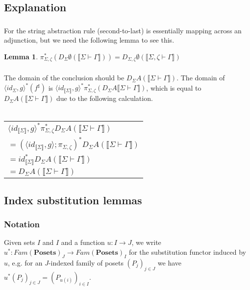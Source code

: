 \documentclass{article}
\newtheorem{lemma}{Lemma}
\newcommand{\mbf}{\mathbf}
\newcommand{\sem}[1]{\llbracket #1 \rrbracket}
\newcommand{\sdisp}[1]{
\left( #1 \right)
}
\begin{document}
\subsection*{Explanation}

\subsubsection*{}
For the string abstraction rule (second-to-last) is essentially mapping across an adjunction, but we need the following lemma to see this.
\begin{lemma}
$\pi^*_{\Sigma,\zeta}(D_{\Sigma} \emptyset(\sem{\Sigma \vdash \Gamma})) = D_{\Sigma,\zeta} \emptyset(\sem{\Sigma,\zeta \vdash \Gamma})$
\end{lemma}

\subsubsection*{}

The domain of the conclusion should be $D_{\Sigma}A(\sem{\Sigma \vdash \Gamma})$. The domain of $\langle \mathit{id}_{\Sigma}, g \rangle^*(f^\sharp)$ is $\langle \mathit{id}_{\sem{\Sigma}}, g \rangle^* \pi_{\Sigma,\zeta}^*(D_{\Sigma} A \sem{\Sigma \vdash \Gamma})$, which is equal to $D_{\Sigma}A(\sem{\Sigma \vdash \Gamma})$ due to the following calculation.\\~\\
\begin{tabu}{l}
$\langle \mathit{id}_{\sem{\Sigma}}, g \rangle^* \pi_{\Sigma,\zeta}^* D_{\Sigma} A (\sem{\Sigma \vdash \Gamma})$ \\
$= (\langle \mathit{id}_{\sem{\Sigma}}, g \rangle; \pi_{\Sigma,\zeta})^* D_{\Sigma} A (\sem{\Sigma \vdash \Gamma})$ \\
$= id_{\sem{\Sigma}}^* D_{\Sigma} A (\sem{\Sigma \vdash \Gamma})$ \\
$= D_{\Sigma} A (\sem{\Sigma \vdash \Gamma})$
\end{tabu}

\subsection*{Index substitution lemmas}

\subsubsection*{Notation}

Given sets $I$ and $I$ and a function $u : I \to J$, we write $u^* : \mathit{Fam}(\mbf{Posets})_J \to \mathit{Fam}(\mbf{Posets})_I$ for the substitution functor induced by $u$, e.g. for an $J$-indexed family of posets $\sdisp{P_j}_{j \in J}$ we have $u^* \sdisp{P_j}_{j \in J} = \sdisp{ P_{u(i)} }_{i \in I}$.
\end{document}
